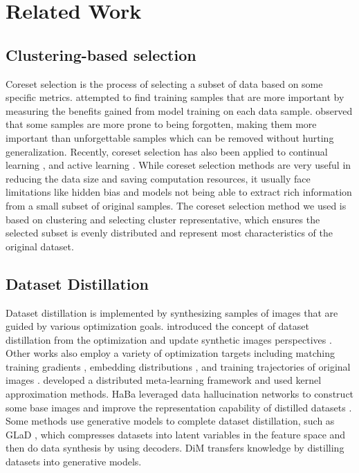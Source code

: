 \documentclass[sigconf, nonacm]{acmart}
\begin{document}
\section{Related Work}
\subsection{Clustering-based selection}
Coreset selection is the process of selecting a subset of data based on some specific metrics. \cite{lapedriza2013sample} attempted to find training samples that are more important by measuring the benefits gained from model training on each data sample. \cite{toneva2018forgetting} observed that some samples are more prone to being forgotten, making them more important than unforgettable samples which can be removed without hurting generalization. Recently, coreset selection has also been applied to continual learning \cite{aljundi2019continual}, \cite{wiewel2021condensed} and active learning \cite{sener2017active}. While coreset selection methods are very useful in reducing the data size and saving computation resources, it usually face limitations like hidden bias and models not being able to extract rich information from a small subset of original samples. The coreset selection method we used is based on clustering and selecting cluster representative, which ensures the selected subset is evenly distributed and represent most characteristics of the original dataset.


\subsection{Dataset Distillation}
Dataset distillation is implemented by synthesizing samples of images that are guided by various optimization goals. \cite{wang2018dataset} introduced the concept of dataset distillation from the optimization and update synthetic images perspectives . Other works also employ a variety of optimization targets including matching training gradients\cite{B.Zhao} \cite{Siamese}, embedding distributions \cite{K.Wang}, and training trajectories of original images \cite{G.Cazenavette}. \cite{Nguyen}developed a distributed meta-learning framework and used kernel approximation methods. HaBa leveraged data hallucination networks to construct some base images
and improve the representation capability of distilled datasets \cite{Liu}. Some methods use generative models to complete
dataset distillation, such as GLaD \cite{Deepgen}, which
compresses datasets into latent variables in the feature space and then do data synthesis by using decoders. DiM \cite{Dim}transfers knowledge by distilling datasets into generative models.
\end{document}
